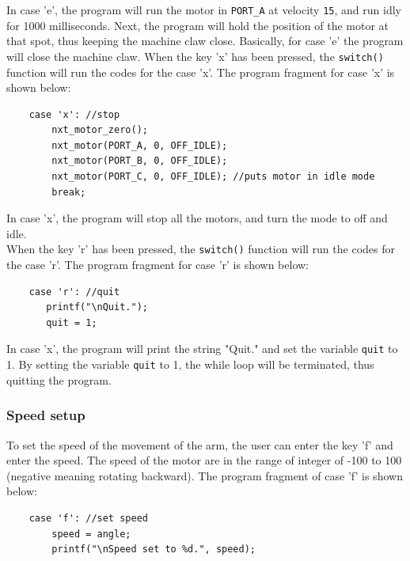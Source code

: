 \documentclass[12pt]{article}
\begin{document}
In case 'e', the program will run the motor in \verb+PORT_A+ at velocity \verb+15+, and run idly for 1000
    milliseconds.
Next, the program will hold the position of the motor at that spot, thus keeping the machine claw close.
Basically, for case 'e' the program will close the machine claw.
When the key 'x' has been pressed, the \verb+switch()+ function will run the codes for the case 'x'.
The program fragment for case 'x' is shown below:
\begin{verbatim} 
    case 'x': //stop
        nxt_motor_zero();
        nxt_motor(PORT_A, 0, OFF_IDLE);
        nxt_motor(PORT_B, 0, OFF_IDLE);
        nxt_motor(PORT_C, 0, OFF_IDLE);	//puts motor in idle mode
        break;
\end{verbatim}
In case 'x', the program will stop all the motors, and turn the mode to off and idle.
\\
When the key 'r' has been pressed, the \verb+switch()+ function will run the codes for the case 'r'.
The program fragment for case 'r' is shown below:
\begin{verbatim} 
    case 'r': //quit
       printf("\nQuit.");
       quit = 1;
\end{verbatim}
In case 'x', the program will print the string "Quit." and set the variable \verb+quit+ to 1.
By setting the variable \verb+quit+ to 1, the while loop will be terminated, thus quitting the program.
\subsubsection*{Speed setup}
To set the speed of the movement of the arm, the user can enter the key 'f' and enter the speed.
The speed of the motor are in the range of integer of -100 to 100 (negative meaning rotating backward).
The program fragment of case 'f' is shown below:
\begin{verbatim}
    case 'f': //set speed
        speed = angle;
        printf("\nSpeed set to %d.", speed);
\end{verbatim}
\end{document}
